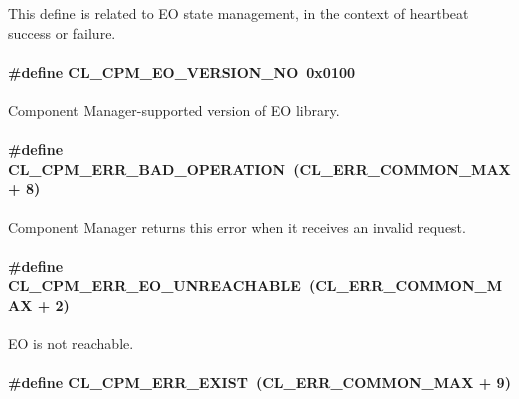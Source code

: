 This define is related to EO state management, in the context of heartbeat success or failure. \hypertarget{group__group14_ga51}{
\paragraph[CL\_\-CPM\_\-EO\_\-VERSION\_\-NO]{\setlength{\rightskip}{0pt plus 5cm}\#define CL\_\-CPM\_\-EO\_\-VERSION\_\-NO~0x0100}\hfill}
\label{group__group14_ga51}


Component Manager-supported version of EO library. \hypertarget{group__group14_ga74}{
\paragraph[CL\_\-CPM\_\-ERR\_\-BAD\_\-OPERATION]{\setlength{\rightskip}{0pt plus 5cm}\#define CL\_\-CPM\_\-ERR\_\-BAD\_\-OPERATION~(CL\_\-ERR\_\-COMMON\_\-MAX + 8)}\hfill}
\label{group__group14_ga74}


Component Manager returns this error when it receives an invalid request. \hypertarget{group__group14_ga68}{
\paragraph[CL\_\-CPM\_\-ERR\_\-EO\_\-UNREACHABLE]{\setlength{\rightskip}{0pt plus 5cm}\#define CL\_\-CPM\_\-ERR\_\-EO\_\-UNREACHABLE~(CL\_\-ERR\_\-COMMON\_\-MAX + 2)}\hfill}
\label{group__group14_ga68}


EO is not reachable. \hypertarget{group__group14_ga75}{
\paragraph[CL\_\-CPM\_\-ERR\_\-EXIST]{\setlength{\rightskip}{0pt plus 5cm}\#define CL\_\-CPM\_\-ERR\_\-EXIST~(CL\_\-ERR\_\-COMMON\_\-MAX + 9)}\hfill}
\label{group__group14_ga75}


